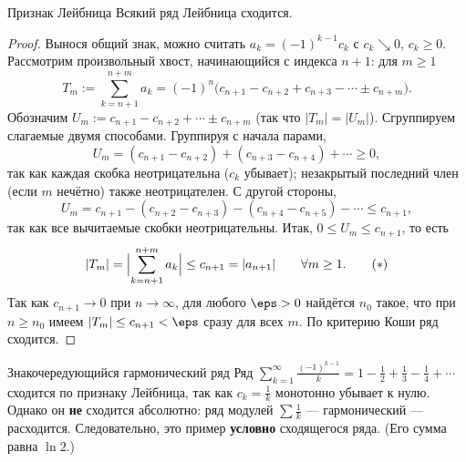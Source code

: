 \begin{Theorem}{Признак Лейбница}{}
	Всякий ряд Лейбница сходится.
\end{Theorem}

\begin{proof}
	Вынося общий знак, можно считать $a_k=(-1)^{k-1} c_k$ с $c_k\searrow0$,
	$c_k\ge0$. Рассмотрим произвольный хвост, начинающийся с индекса $n+1$:
	для $m\ge1$
	\[
	T_m:=\sum_{k=n+1}^{n+m} a_k
	=(-1)^{n}\bigl(c_{n+1}-c_{n+2}+c_{n+3}-\cdots\pm c_{n+m}\bigr).
	\]
	Обозначим $U_m:=c_{n+1}-c_{n+2}+\cdots\pm c_{n+m}$ (так что $|T_m|=|U_m|$).
	Сгруппируем слагаемые двумя способами. Группируя с начала парами,
	\[
	U_m=(c_{n+1}-c_{n+2})+(c_{n+3}-c_{n+4})+\cdots\ge0,
	\]
	так как каждая скобка неотрицательна ($c_k$ убывает); незакрытый последний
	член (если $m$ нечётно) также неотрицателен. С другой стороны,
	\[
	U_m=c_{n+1}-(c_{n+2}-c_{n+3})-(c_{n+4}-c_{n+5})-\cdots\le c_{n+1},
	\]
	так как все вычитаемые скобки неотрицательны. Итак, $0\le U_m\le c_{n+1}$, то
	есть
	\[
	|T_m|=\Bigl|\sum_{k=n+1}^{n+m} a_k\Bigr|\le c_{n+1}=|a_{n+1}|
	\qquad\forall m\ge1.
	\tag{$\ast$}
	\]
	Так как $c_{n+1}\to0$ при $n\to\infty$, для любого $\eps>0$ найдётся $n_0$
	такое, что при $n\ge n_0$ имеем $|T_m|\le c_{n+1}<\eps$ сразу для всех $m$.
	По критерию Коши ряд сходится.
\end{proof}

\begin{Example}{Знакочередующийся гармонический ряд}{}
	Ряд $\displaystyle\sum_{k=1}^{\infty}\frac{(-1)^{k-1}}{k}
	=1-\frac12+\frac13-\frac14+\cdots$ сходится по признаку Лейбница, так как
	$c_k=\frac1k$ монотонно убывает к нулю. Однако он \textbf{не} сходится
	абсолютно: ряд модулей $\sum\frac1k$ --- гармонический --- расходится.
	Следовательно, это пример \textbf{условно} сходящегося ряда. (Его сумма
	равна $\ln2$.)
\end{Example}
